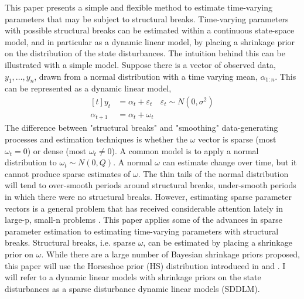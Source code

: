 This paper presents a simple and flexible method to estimate time-varying parameters that may be subject to structural breaks.
Time-varying parameters with possible structural breaks can be estimated within a continuous state-space model, and in particular as a dynamic linear model, by placing a shrinkage prior on the distribution of the state disturbances.
The intuition behind this can be illustrated with a simple model.
Suppose there is a vector of observed data, $y_{1}, \dots, y_{n}$, drawn from a normal distribution with a time varying mean, $\alpha_{1:n}$. 
This can be represented as a dynamic linear model,
\begin{equation}
  \label{dlm:eq:4}
  \begin{aligned}[t]
    y_{t} &= \alpha_{t} + \varepsilon_{t} & \varepsilon_{t} \sim N(0, \sigma^{2}) \\
    \alpha_{t + 1} &= \alpha_{t} + \omega_{t}
  \end{aligned}
\end{equation}
The difference between "structural breaks" and "smoothing" data-generating processes and estimation techniques is whether the $\omega$ vector is sparse (most $\omega_{t} = 0$) or dense (most $\omega_{t} \neq 0$).
A common model is to apply a normal distribution to $\omega_{t} \sim N(0, Q)$.
A normal $\omega$ can estimate change over time, but it cannot produce sparse estimates of $\omega$.
The thin tails of the normal distribution will tend to over-smooth periods around structural breaks, under-smooth periods in which there were no structural breaks.
However, estimating sparse parameter vectors is a general problem that has received considerable attention lately in large-p, small-n problems \parencites{Tibshirani1996}{PolsonScott2010}.
This paper applies some of the advances in sparse parameter estimation to estimating time-varying parameters with structural breaks.
Structural breaks, i.e. sparse $\omega$, can be estimated by placing a shrinkage prior on $\omega$.
While there are a large number of Bayesian shrinkage priors proposed, this paper will use the Horseshoe prior (HS) distribution introduced in \textcites{CarvalhoPolsonScott2009} and \textcite{CarvalhoPolsonScott2010}.
I will refer to a dynamic linear models with shrinkage priors on the state disturbances as a sparse disturbance dynamic linear models (SDDLM).

